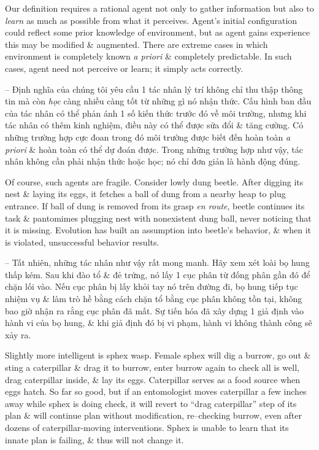 \documentclass{article}
\begin{document}
\begin{itemize}
\begin{itemize}
\begin{itemize}
\begin{itemize}
				Our definition requires a rational agent not only to gather information but also to {\it learn} as much as possible from what it perceives. Agent's initial configuration could reflect some prior knowledge of environment, but as agent gains experience this may be modified \& augmented. There are extreme cases in which environment is completely known {\it a priori} \& completely predictable. In such cases, agent need not perceive or learn; it simply acts correctly.

				-- Định nghĩa của chúng tôi yêu cầu 1 tác nhân lý trí không chỉ thu thập thông tin mà còn {\it học} càng nhiều càng tốt từ những gì nó nhận thức. Cấu hình ban đầu của tác nhân có thể phản ánh 1 số kiến thức trước đó về môi trường, nhưng khi tác nhân có thêm kinh nghiệm, điều này có thể được sửa đổi \& tăng cường. Có những trường hợp cực đoan trong đó môi trường được biết đến hoàn toàn {\it a priori} \& hoàn toàn có thể dự đoán được. Trong những trường hợp như vậy, tác nhân không cần phải nhận thức hoặc học; nó chỉ đơn giản là hành động đúng.

				Of course, such agents are fragile. Consider lowly dung beetle. After digging its nest \& laying its eggs, it fetches a ball of dung from a nearby heap to plug entrance. If ball of dung is removed from its grasp {\it en route}, beetle continues its task \& pantomimes plugging nest with nonexistent dung ball, never noticing that it is missing. Evolution has built an assumption into beetle's behavior, \& when it is violated, unsuccessful behavior results.

				-- Tất nhiên, những tác nhân như vậy rất mong manh. Hãy xem xét loài bọ hung thấp kém. Sau khi đào tổ \& đẻ trứng, nó lấy 1 cục phân từ đống phân gần đó để chặn lối vào. Nếu cục phân bị lấy khỏi tay nó trên đường đi, bọ hung tiếp tục nhiệm vụ \& làm trò hề bằng cách chặn tổ bằng cục phân không tồn tại, không bao giờ nhận ra rằng cục phân đã mất. Sự tiến hóa đã xây dựng 1 giả định vào hành vi của bọ hung, \& khi giả định đó bị vi phạm, hành vi không thành công sẽ xảy ra.

				Slightly more intelligent is sphex wasp. Female sphex will dig a burrow, go out \& sting a caterpillar \& drag it to burrow, enter burrow again to check all is well, drag caterpillar inside, \& lay its eggs. Caterpillar serves as a food source when eggs hatch. So far so good, but if an entomologist moves caterpillar a few inches away while sphex is doing check, it will revert to ``drag caterpillar'' step of its plan \& will continue plan without modification, re--checking burrow, even after dozens of caterpillar-moving interventions. Sphex is unable to learn that its innate plan is failing, \& thus will not change it.


\end{itemize}
\end{itemize}
\end{itemize}
\end{itemize}
\end{document}
